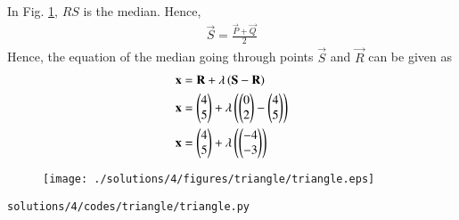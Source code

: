 In Fig. \ref{fig:1.2.4_angle_py}, $RS$ is the median.  Hence, 
\begin{align}
	\vec S = \frac{\vec P + \vec Q}{2}
\end{align}
%
Hence, the equation of the median going through points $\vec S$ and $\vec R$ can be given as 
\begin{align}
	\mathbf x &= \mathbf R + \lambda \left(\mathbf S - \mathbf R\right)
	\\
	\mathbf x &= \begin{pmatrix}4\\5\end{pmatrix} + \lambda \left(\begin{pmatrix}0\\2\end{pmatrix} - \begin{pmatrix}4\\5\end{pmatrix}\right)
	\\
	\mathbf x &= \begin{pmatrix}4\\5\end{pmatrix} + \lambda \left(\begin{pmatrix}-4\\-3\end{pmatrix}\right)
\end{align}
\begin{figure}[!ht]
	\centering
	\texttt{[image: ./solutions/4/figures/triangle/triangle.eps]}
	\caption{}
	\label{fig:1.2.4_angle_py}
\end{figure}
\begin{lstlisting}
solutions/4/codes/triangle/triangle.py
\end{lstlisting}
